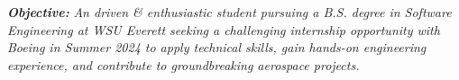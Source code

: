 \textbf{\textit{Objective:}}
\textit{An driven \& enthusiastic student pursuing a B.S. degree in Software Engineering at WSU Everett seeking a challenging internship opportunity with Boeing in Summer 2024 to apply technical skills, gain hands-on engineering experience, and contribute to groundbreaking aerospace projects.}
